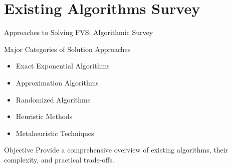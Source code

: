 \documentclass[aspectratio=169]{beamer}
\begin{document}

\section{Existing Algorithms Survey}


\begin{frame}{Approaches to Solving FVS: Algorithmic Survey}


\begin{block}{Major Categories of Solution Approaches}
\begin{itemize}
    \item Exact Exponential Algorithms
    \item Approximation Algorithms
    \item Randomized Algorithms
    \item Heuristic Methods
    \item Metaheuristic Techniques
\end{itemize}
\end{block}

\vspace{0.3cm}

\begin{alertblock}{Objective}
Provide a comprehensive overview of existing algorithms,
their complexity, and practical trade-offs.
\end{alertblock}

\end{frame}

\end{document}
